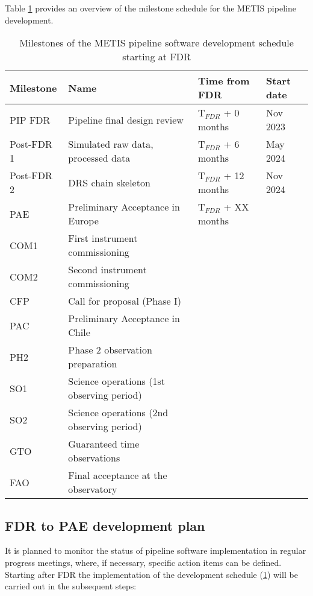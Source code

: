 Table \ref{tab:development_schedule} provides an overview of the milestone schedule for the METIS pipeline development.

\begin{table}
    \caption[Development schedule]{Milestones of the METIS pipeline software development schedule starting at FDR}
  \label{tab:development_schedule}
  \centering\scriptsize
  \begin{tabularx}{\textwidth}{llll}
    \hline
    Milestone & Name & Time from FDR & Start date \\
    \hline\hline
    PIP FDR          & Pipeline final design review & T$_ {FDR}$ + 0 months & Nov 2023 \\
    Post-FDR 1       & Simulated raw data, processed data &  T$_ {FDR}$ + 6 months & May 2024 \\
    Post-FDR 2       & DRS chain skeleton               &  T$_{FDR}$ + 12 months & Nov 2024 \\
    PAE              & Preliminary Acceptance in Europe &  T$_{FDR}$ + XX months &  \\
    COM1             & First instrument commissioning &  & \\
    COM2             & Second instrument commissioning &  & \\
    CFP              & Call for proposal (Phase I) &  & \\
    PAC              & Preliminary Acceptance in Chile &  & \\
    PH2              & Phase 2 observation preparation &  & \\
    SO1              & Science operations (1st observing period) &  & \\
    SO2              & Science operations (2nd observing period) &  & \\
    GTO              & Guaranteed time observations &  & \\
    FAO              & Final acceptance at the observatory & & \\
    \hline
  \end{tabularx}
\end{table}

\subsection{FDR to PAE development plan}
\label{ssec:fdr2pae}

It is planned to monitor the status of pipeline software implementation in regular progress meetings, where, if necessary, specific action items can be defined. Starting after FDR the implementation of the development schedule (\ref{tab:development_schedule}) will be carried out in the subsequent steps:

